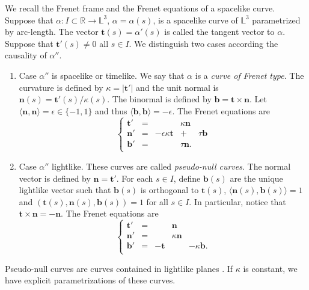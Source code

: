 \documentclass[a4paper,12pt]{amsart}
\numberwithin{equation}{section}
\theoremstyle{definition}
\def\r{\mathbb R}
\def\r{\mathbb R}
\def\rr{\mathbb L}
\def\t{\mathbf t}
\def\n{\mathbf n}
\def\b{\mathbf b}
\begin{document}
We recall the Frenet frame and the Frenet equations of a spacelike curve. Suppose that $\alpha\colon I\subset \r\to\rr^3$, $\alpha=\alpha(s)$, is a spacelike curve of $\rr^3$ parametrized by arc-length. The vector $\t(s)=\alpha'(s)$ is called the tangent vector to $\alpha$.  Suppose that $\t'(s) \not=0$  all $s\in I$. We distinguish two cases according the causality of $\alpha''$. 


\begin{enumerate}
\item Case   $\alpha''$ is spacelike or timelike. We say that $\alpha$ is a {\it curve of Frenet type}. The curvature is defined by $\kappa=|\t'|$ and the unit normal is $\n(s)=\t'(s)/\kappa(s)$. The binormal is defined by  $\b=\t\times\n$. Let $\langle\n,\n\rangle=\epsilon\in\{-1,1\}$ and thus $\langle \b,\b\rangle=-\epsilon$.  The Frenet equations are
\begin{equation}\label{f1}
\left\{\begin{array}{ccccc}
\t'&=& &\kappa \n & \\
\n'&=&-\epsilon\kappa \t& +& \tau \b\\
\b'&=& & \tau \n. & \\
\end{array}\right.
\end{equation}
 
\item Case  $\alpha''$ lightlike. These curves are called {\it pseudo-null curves}. The normal vector is defined by  $\n=\t'$. For each $s\in I$, define $\b(s)$ are the unique  lightlike vector such that $\b(s)$ is orthogonal to $\t(s)$, $\langle \n(s),\b(s)\rangle=1$ and $(\t(s),\n(s),\b(s))=1$ for all $s\in I$.   In particular, notice that  $\t\times\n=-\n$. The Frenet equations are
\begin{equation}\label{f3}
\left\{\begin{array}{ccccc}
\t'&=& & \n & \\
\n'&=&& \kappa \n&  \\
\b'&=&-\t &  &-\kappa \b. \\
\end{array}\right.
\end{equation}


\end{enumerate}

Pseudo-null curves are curves contained in lightlike planes \cite{da}. If  $\kappa$ is constant, we have explicit parametrizations  of these curves.  
\end{document}
